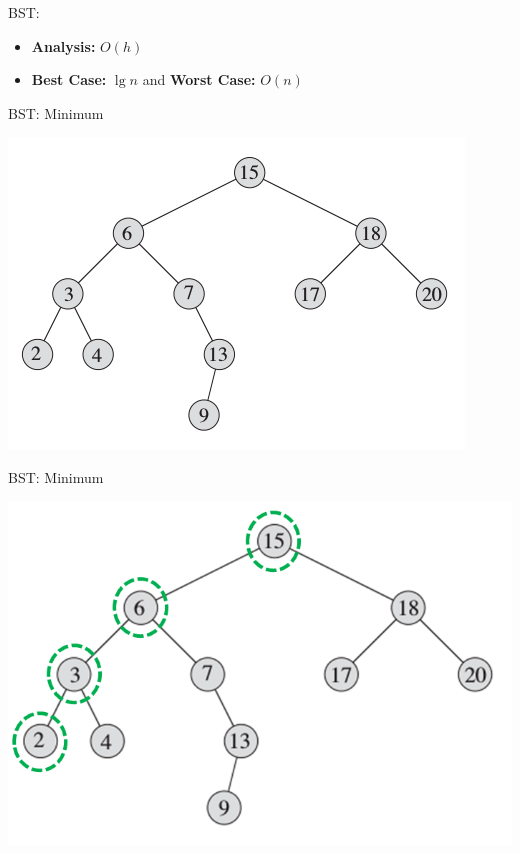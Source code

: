 \documentclass{beamer}
\begin{document}
\begin{frame}[fragile]{BST: }
    \begin{itemize}
        \item {\bf Analysis:} \pause $O(h)$ 
        \item {\bf Best Case:} $\lg n$ and {\bf Worst Case:} $O(n)$
    \end{itemize}
\end{frame}


\begin{frame}{BST: Minimum}

    \begin{center}
        \includegraphics[scale=0.6]{bstMinimum.png}
    \end{center}
\end{frame}


\begin{frame}{BST: Minimum}

    \begin{center}
        \includegraphics[scale=0.5]{bstMinimum2.png}
    \end{center}
\end{frame}
\end{document}
